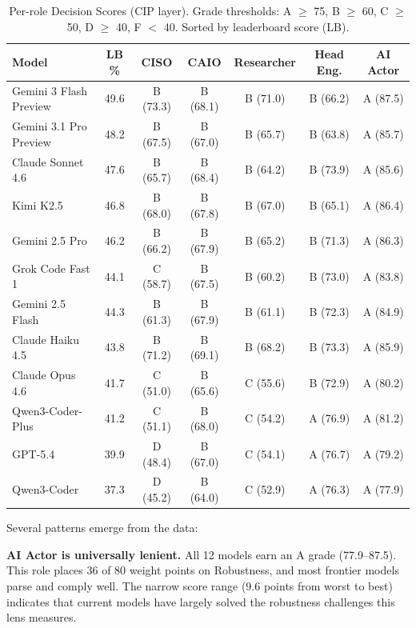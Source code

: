 \documentclass[10pt,twocolumn]{article}
\begin{document}
\begin{table}[t]
\centering
\caption{Per-role Decision Scores (CIP layer). Grade thresholds: A $\geq$ 75, B $\geq$ 60, C $\geq$ 50, D $\geq$ 40, F $<$ 40. Sorted by leaderboard score (LB).}
\label{tab:decision_scores}
\small
\begin{tabular}{@{}l c c c c c c@{}}
\toprule
\textbf{Model} & \textbf{LB \%} & \textbf{CISO} & \textbf{CAIO} & \textbf{Researcher} & \textbf{Head Eng.} & \textbf{AI Actor} \\
\midrule
Gemini 3 Flash Preview   & 49.6 & B (73.3) & B (68.1) & B (71.0) & B (66.2) & A (87.5) \\
Gemini 3.1 Pro Preview   & 48.2 & B (67.5) & B (67.0) & B (65.7) & B (63.8) & A (85.7) \\
Claude Sonnet 4.6        & 47.6 & B (65.7) & B (68.4) & B (64.2) & B (73.9) & A (85.6) \\
Kimi K2.5                & 46.8 & B (68.0) & B (67.8) & B (67.0) & B (65.1) & A (86.4) \\
Gemini 2.5 Pro           & 46.2 & B (66.2) & B (67.9) & B (65.2) & B (71.3) & A (86.3) \\
Grok Code Fast 1         & 44.1 & C (58.7) & B (67.5) & B (60.2) & B (73.0) & A (83.8) \\
Gemini 2.5 Flash         & 44.3 & B (61.3) & B (67.9) & B (61.1) & B (72.3) & A (84.9) \\
Claude Haiku 4.5         & 43.8 & B (71.2) & B (69.1) & B (68.2) & B (73.3) & A (85.9) \\
Claude Opus 4.6          & 41.7 & C (51.0) & B (65.6) & C (55.6) & B (72.9) & A (80.2) \\
Qwen3-Coder-Plus         & 41.2 & C (51.1) & B (68.0) & C (54.2) & A (76.9) & A (81.2) \\
GPT-5.4                  & 39.9 & D (48.4) & B (67.0) & C (54.1) & A (76.7) & A (79.2) \\
Qwen3-Coder              & 37.3 & D (45.2) & B (64.0) & C (52.9) & A (76.3) & A (77.9) \\
\bottomrule
\end{tabular}
\end{table}

Several patterns emerge from the data:

\textbf{AI Actor is universally lenient.} All 12 models earn an A grade (77.9--87.5). This role places 36 of 80 weight points on Robustness, and most frontier models parse and comply well. The narrow score range (9.6 points from worst to best) indicates that current models have largely solved the robustness challenges this lens measures.
\end{document}
